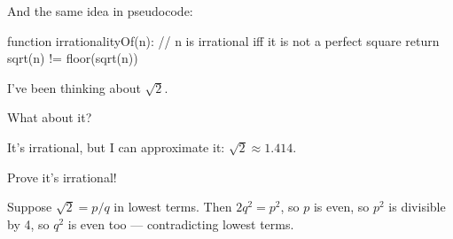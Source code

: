 \documentclass{ximera}
\begin{document}
And the same idea in pseudocode:
\begin{code}
function irrationalityOf(n):
  // n is irrational iff it is not a perfect square
  return sqrt(n) != floor(sqrt(n))
\end{code}

\begin{dialogue}
  \item[Alice] I've been thinking about $\sqrt{2}$.
  \item[Bob] What about it?
  \item[Alice] It's irrational, but I can approximate it: $\sqrt{2} \approx 1.414$.
  \item[Bob] Prove it's irrational!
  \item[Alice] Suppose $\sqrt{2} = p/q$ in lowest terms. Then $2q^2 = p^2$, so $p$ is even, so $p^2$ is divisible by 4, so $q^2$ is even too --- contradicting lowest terms.
\end{dialogue}
\end{document}
